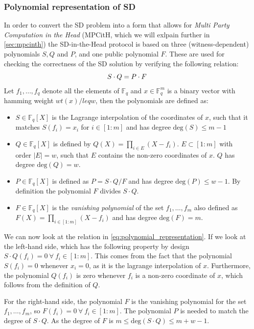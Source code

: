 \documentclass[twoside,11pt]{report}
\theoremstyle{definition}
\theoremstyle{plain}
\begin{document}
\subsubsection{Polynomial representation of SD}\label{sec:polynomial_representation}
In order to convert the SD problem into a form that allows for \textit{Multi Party Computation in the Head} (MPCitH, which we will exlpain further in \autoref{sec:mpcinth}) the SD-in-the-Head protocol is based on three (witness-dependent) polynomials $S, Q$ and $P$, and one public polynomial $F$.
These are used for checking the correctness of the SD solution by verifying the following relation:
\begin{equation}
  \centering
  S\cdot Q = P\cdot F\label{eq:polynomial_representation}
\end{equation}
Let $f_1,\dots, f_q$ denote all the elements of $\mathbb{F}_q$ and $x\in \mathbb{F}^m_q$ is a binary vector with hamming weight $wt(x) /leq w$, then the polynomials are defined as:
\begin{itemize}
  \item $S\in \mathbb{F}_q[X]$ is the Lagrange interpolation of the coordinates of $x$, such that it matches $S(f_i) = x_i$ for $i\in [1:m]$ and has degree $\text{deg}(S) \leq m-1$
  \item $Q\in \mathbb{F}_q[X]$ is defined by $Q(X) = \prod_{i\in E}(X - f_i)$. $E \subset [1:m]$ with order $|E| = w$, such that $E$ contains the non-zero coordinates of $x$. $Q$ has degree $\text{deg}(Q) = w$.
  \item $P\in \mathbb{F}_q[X]$ is defined as $P = S\cdot Q/F$ and has degree $\text{deg}(P) \leq w-1$. By definition the polynomial $F$ divides $S\cdot Q$.
  \item $F\in \mathbb{F}_q[X]$ is the \textit{vanishing polynomial} of the set ${f_1, \dots, f_m}$ also defined as $F(X) = \prod_{i\in [1:m]}(X - f_i)$ and has degree $\text{deg}(F) = m$.
\end{itemize}
We can now look at the relation in \autoref{eq:polynomial_representation}. If we look at the left-hand side, which has the following property by design $S\cdot Q(f_i) = 0 \ \forall\ f_i \in [1:m]$. This comes from the fact that the polynomial $S(f_i) = 0$ whenever $x_i = 0$, as it is the lagrange interpolation of $x$. Furthermore, the polynomial $Q(f_i)$ is zero whenever $f_i$ is a non-zero coordinate of $x$, which follows from the definition of $Q$.

For the right-hand side, the polynomial $F$ is the vanishing polynomial for the set ${f_1, \dots, f_m}$, so $F(f_i) = 0\ \forall\ f_i \in [1:m]$. The polynomial $P$ is needed to match the degree of $S \cdot Q$. As the degree of $F$ is $m \leq \text{deg}(S\cdot Q) \leq m + w - 1$.
\end{document}
